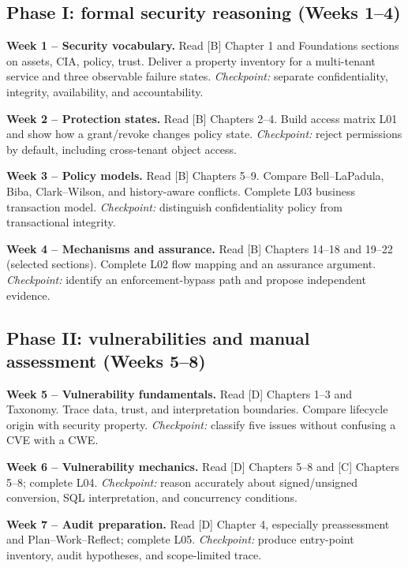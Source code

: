 \documentclass[
  letterpaper,
]{article}
\begin{document}
\subsection{Phase I: formal security reasoning (Weeks
1--4)}\label{phase-i-formal-security-reasoning-weeks-14}

\textbf{Week 1 -- Security vocabulary.} Read {[}B{]} Chapter 1 and
Foundations sections on assets, CIA, policy, trust. Deliver a property
inventory for a multi-tenant service and three observable failure
states. \emph{Checkpoint:} separate confidentiality, integrity,
availability, and accountability.

\textbf{Week 2 -- Protection states.} Read {[}B{]} Chapters 2--4. Build
access matrix L01 and show how a grant/revoke changes policy state.
\emph{Checkpoint:} reject permissions by default, including cross-tenant
object access.

\textbf{Week 3 -- Policy models.} Read {[}B{]} Chapters 5--9. Compare
Bell--LaPadula, Biba, Clark--Wilson, and history-aware conflicts.
Complete L03 business transaction model. \emph{Checkpoint:} distinguish
confidentiality policy from transactional integrity.

\textbf{Week 4 -- Mechanisms and assurance.} Read {[}B{]} Chapters
14--18 and 19--22 (selected sections). Complete L02 flow mapping and an
assurance argument. \emph{Checkpoint:} identify an enforcement-bypass
path and propose independent evidence.

\subsection{Phase II: vulnerabilities and manual assessment (Weeks
5--8)}\label{phase-ii-vulnerabilities-and-manual-assessment-weeks-58}

\textbf{Week 5 -- Vulnerability fundamentals.} Read {[}D{]} Chapters
1--3 and Taxonomy. Trace data, trust, and interpretation boundaries.
Compare lifecycle origin with security property. \emph{Checkpoint:}
classify five issues without confusing a CVE with a CWE.

\textbf{Week 6 -- Vulnerability mechanics.} Read {[}D{]} Chapters 5--8
and {[}C{]} Chapters 5--8; complete L04. \emph{Checkpoint:} reason
accurately about signed/unsigned conversion, SQL interpretation, and
concurrency conditions.

\textbf{Week 7 -- Audit preparation.} Read {[}D{]} Chapter 4, especially
preassessment and Plan--Work--Reflect; complete L05. \emph{Checkpoint:}
produce entry-point inventory, audit hypotheses, and scope-limited
trace.
\end{document}
